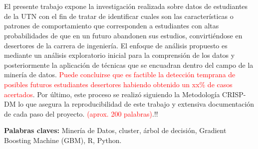 \chapter*{\runtitulo}

\noindent El presente trabajo expone la investigación realizada sobre datos de estudiantes de la UTN  con el fin de tratar de identificar cuales son las características o patrones de comportamiento que corresponden a estudiantes con altas probabilidades de que en un futuro abandonen sus estudios, convirtiéndose en desertores de la carrera de ingeniería. El enfoque de análisis propuesto es mediante un análisis exploratorio inicial para la comprensión de los datos y posteriormente la aplicación de técnicas que se encuadran dentro del campo de la minería de datos. \textcolor{red}{Puede concluirse que es factible la detección temprana de posibles futuros estudiantes desertores habiendo obtenido un xx\% de casos acertados}. Por último, este proceso se realizó siguiendo la Metodología CRISP-DM lo que asegura la reproducibilidad de este trabajo y extensiva documentación de cada paso del proyecto.
\textcolor{red}{(aprox. 200 palabras)}.!!

\bigskip

\noindent\textbf{Palabras claves:} Minería de Datos, cluster, árbol de decisión, Gradient Boosting Machine (GBM), R, Python.


